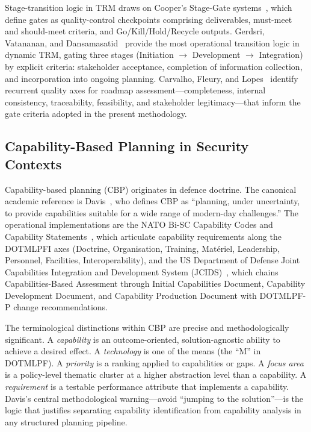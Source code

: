 Stage-transition logic in TRM draws on Cooper's Stage-Gate
systems~\cite{cooper1990}, which define gates as quality-control
checkpoints comprising deliverables, must-meet and should-meet criteria,
and Go/Kill/Hold/Recycle outputs. Gerdsri, Vatananan, and
Dansamasatid~\cite{gerdsri2009} provide the most operational transition
logic in dynamic TRM, gating three stages (Initiation $\rightarrow$
Development $\rightarrow$ Integration) by explicit criteria: stakeholder
acceptance, completion of information collection, and incorporation into
ongoing planning. Carvalho, Fleury, and Lopes~\cite{carvalho2013}
identify recurrent quality axes for roadmap assessment---completeness,
internal consistency, traceability, feasibility, and stakeholder
legitimacy---that inform the gate criteria adopted in the present
methodology.

\subsection{Capability-Based Planning in Security Contexts}
\label{sec:rw_cbp}

Capability-based planning (CBP) originates in defence doctrine. The
canonical academic reference is Davis~\cite{davis2002}, who defines CBP
as ``planning, under uncertainty, to provide capabilities suitable for a
wide range of modern-day challenges.'' The operational implementations
are the NATO Bi-SC Capability Codes and Capability
Statements~\cite{nato_bisc2016}, which articulate capability requirements
along the DOTMLPFI axes (Doctrine, Organisation, Training, Mat\'{e}riel,
Leadership, Personnel, Facilities, Interoperability), and the US
Department of Defense Joint Capabilities Integration and Development
System (JCIDS)~\cite{jcids2021}, which chains Capabilities-Based
Assessment through Initial Capabilities Document, Capability Development
Document, and Capability Production Document with DOTMLPF-P change
recommendations.

The terminological distinctions within CBP are precise and
methodologically significant. A \textit{capability} is an
outcome-oriented, solution-agnostic ability to achieve a desired effect.
A \textit{technology} is one of the means (the ``M'' in DOTMLPF). A
\textit{priority} is a ranking applied to capabilities or gaps. A
\textit{focus area} is a policy-level thematic cluster at a higher
abstraction level than a capability. A \textit{requirement} is a testable
performance attribute that implements a capability. Davis's central
methodological warning---avoid ``jumping to the solution''---is the logic
that justifies separating capability identification from capability
analysis in any structured planning pipeline.

